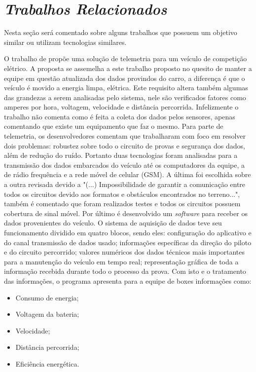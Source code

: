 \chapter{\textit{Trabalhos Relacionados}}
	\label{ch:trabalhos}
Nesta seção será comentado sobre alguns trabalhos que possuem um objetivo similar ou utilizam tecnologias similares. 

O trabalho de  propõe uma solução de telemetria para um veículo de competição elétrico. A proposta se assemelha a este trabalho proposto no quesito de manter a equipe em questão atualizada dos dados provindos do carro, a diferença é que o veículo é movido a energia limpa, elétrica. Este requisito altera também algumas das grandezas a serem analisadas pelo sistema, nele são verificados fatores como amperes por hora, voltagem, velocidade e distância percorrida. Infelizmente o trabalho não comenta como é feita a coleta dos dados pelos sensores, apenas comentando que existe um equipamento que faz o mesmo. Para parte de telemetria, os desenvolvedores comentam que trabalharam com foco em resolver dois problemas: robustez sobre todo o circuito de provas e segurança dos dados, além de redução do ruído. Portanto duas tecnologias foram analisadas para a transmissão dos dados embarcados do veículo até os computadores da equipe, a de rádio frequência e a rede móvel de celular (GSM). A última foi escolhida sobre a outra revisada devido a "(...) Impossibilidade de garantir a comunicação entre todos os circuitos devido aos formatos e obstáculos encontrados no terreno...", também é comentado que foram realizados testes e todos os circuitos possuem cobertura de sinal móvel. Por último é desenvolvido um \textit{software} para receber os dados provenientes do veículo. O sistema de aquisição de dados teve seu funcionamento dividido em quatro blocos, sendo eles: configuração do aplicativo e do canal transmissão de dados usado; informações específicas da direção do piloto e do circuito percorrido; valores numéricos dos dados técnicos mais importantes para a manutenção do veículo em tempo real; representação gráfica de toda a informação recebida durante todo o processo da prova. Com isto e o tratamento das informações, o programa apresenta para a equipe de boxes informações como:

\begin{itemize}
	\item Consumo de energia; 
	\item Voltagem da bateria;
	\item Velocidade;
	\item Distância percorrida;
	\item Eficiência energética.
\end{itemize}

